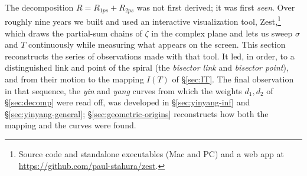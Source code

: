 \documentclass[11pt]{article}
\theoremstyle{definition}
\begin{document}
The decomposition $R=R_{1ps}+R_{2ps}$ was not first derived; it was first
\emph{seen}. Over roughly nine years we built and used an interactive
visualization tool, Zest,\footnote{Source code and standalone executables (Mac
and PC) and a web app at \url{https://github.com/paul-stahura/zest}.} which draws the
partial-sum chains of $\zeta$ in the complex plane and lets us sweep $\sigma$
and $T$ continuously while measuring what appears on the screen. This section
reconstructs the series of observations made with that tool. It led, in order,
to a distinguished link and point of the spiral (the \emph{bisector link} and
\emph{bisector point}), and from their motion to the mapping $I(T)$ of
\S\ref{sec:IT}. The final observation in that sequence, the \emph{yin} and
\emph{yang} curves from which the weights $d_1,d_2$ of \S\ref{sec:decomp}
were read off, was developed in \S\ref{sec:yinyang-inf} and
\S\ref{sec:yinyang-general}; \S\ref{sec:geometric-origins} reconstructs how
both the mapping and the curves were found.
\end{document}
